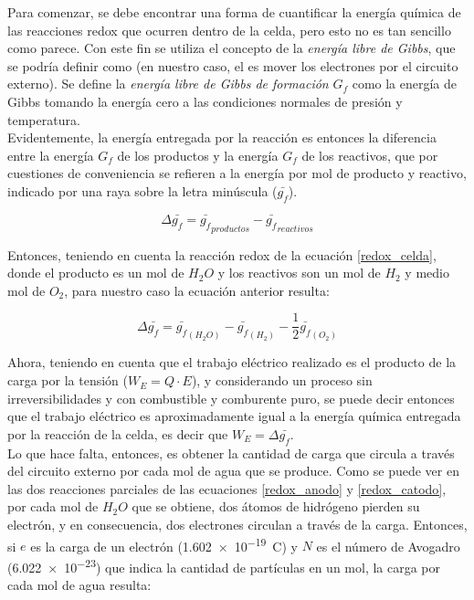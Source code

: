 Para comenzar, se debe encontrar una forma de cuantificar la energía química de las reacciones redox que ocurren dentro de la celda, pero esto no es tan sencillo como parece. Con este fin se utiliza el concepto de la \textit{energía libre de Gibbs}, que se podría definir como  (en nuestro caso, el  es mover los electrones por el circuito externo). Se define la \textit{energía libre de Gibbs de formación} $G_f$ como la energía de Gibbs tomando la energía cero a las condiciones normales de presión y temperatura.\\

Evidentemente, la energía entregada por la reacción es entonces la diferencia entre la energía $G_f$ de los productos y la energía $G_f$ de los reactivos, que por cuestiones de conveniencia se refieren a la energía por mol de producto y reactivo, indicado por una raya sobre la letra minúscula ($\bar{g_f}$).

\begin{equation}\label{delta_gibbs}
    \Delta\bar{g_f} = \bar{g_f}_{productos} - \bar{g_f}_{reactivos}
\end{equation}

Entonces, teniendo en cuenta la reacción redox de la ecuación \ref{redox_celda}, donde el producto es un mol de $H_2O$ y los reactivos son un mol de $H_2$ y medio mol de $O_2$, para nuestro caso la ecuación anterior resulta:

\begin{equation}\label{delta_gibbs_celda}
    \Delta\bar{g_f} = \bar{g_f}_{(H_2O)} - \bar{g_f}_{(H_2)} - \frac{1}{2}\bar{g_f}_{(O_2)}
\end{equation}

Ahora, teniendo en cuenta que el trabajo eléctrico realizado es el producto de la carga por la tensión ($W_E=Q\cdot E$), y considerando un proceso sin irreversibilidades y con combustible y comburente puro, se puede decir entonces que el trabajo eléctrico es aproximadamente igual a la energía química entregada por la reacción de la celda, es decir que $W_E = \Delta\bar{g_f}$.\\

Lo que hace falta, entonces, es obtener la cantidad de carga que circula a través del circuito externo por cada mol de agua que se produce. Como se puede ver en las dos reacciones parciales de las ecuaciones \ref{redox_anodo} y \ref{redox_catodo}, por cada mol de $H_2O$ que se obtiene, dos átomos de hidrógeno pierden su electrón, y en consecuencia, dos electrones circulan a través de la carga. Entonces, si $e$ es la carga de un electrón (\SI{1.602e-19}{\coulomb}) y $N$ es el número de Avogadro (\num{6.022e-23}) que indica la cantidad de partículas en un mol, la carga por cada mol de agua resulta:

